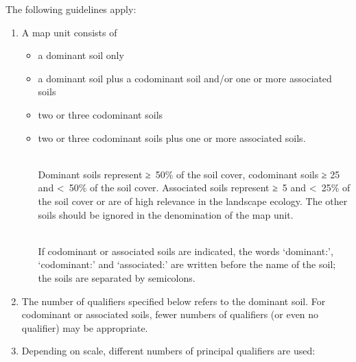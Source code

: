 \documentclass[
  letterpaper,
  DIV=11,
  numbers=noendperiod]{scrreprt}
\providecommand{\tightlist}{%
  \setlength{\itemsep}{0pt}\setlength{\parskip}{0pt}}\usepackage{longtable,booktabs,array}
\begin{document}
The following guidelines apply:

\begin{enumerate}
\def\labelenumi{\arabic{enumi}.}
\item
  A map unit consists of

  \begin{itemize}
  \tightlist
  \item
    a dominant soil only
  \item
    a dominant soil plus a codominant soil and/or one or more associated
    soils
  \item
    two or three codominant soils
  \item
    two or three codominant soils plus one or more associated soils.\\
    \strut \\
    Dominant soils represent ≥~50\% of the soil cover, codominant soils
    ≥ 25 and \textless~50\% of the soil cover. Associated soils
    represent ≥~5 and \textless~25\% of the soil cover or are of high
    relevance in the landscape ecology. The other soils should be
    ignored in the denomination of the map unit.\\
    \strut \\
    If codominant or associated soils are indicated, the words
    `dominant:', `codominant:' and `associated:' are written before the
    name of the soil; the soils are separated by semicolons.
  \end{itemize}
\item
  The number of qualifiers specified below refers to the dominant soil.
  For codominant or associated soils, fewer numbers of qualifiers (or
  even no qualifier) may be appropriate.
\item
  Depending on scale, different numbers of principal qualifiers are
  used:


\end{enumerate}
\end{document}
